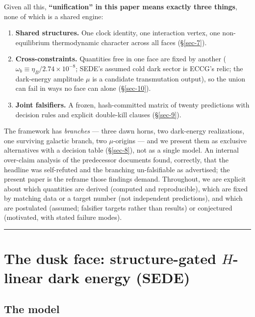 \documentclass[submission, Phys]{SciPost}
\providecommand{\tightlist}{\setlength{\itemsep}{0pt}\setlength{\parskip}{0pt}}
\begin{document}
Given all this, \textbf{``unification'' in this paper means exactly
three things}, none of which is a shared engine:

\begin{enumerate}
\def\labelenumi{\arabic{enumi}.}
\tightlist
\item
  \textbf{Shared structures.} One clock identity, one interaction
  vertex, one non-equilibrium thermodynamic character across all faces
  (§\ref{sec-7}).
\item
  \textbf{Cross-constraints.} Quantities free in one face are fixed by
  another (\(\omega_b \equiv \eta_B/2.74\times10^{-8}\); SEDE's assumed
  cold dark sector is ECCG's relic; the dark-energy amplitude \(\mu\) is
  a candidate transmutation output), so the union can fail in ways no
  face can alone (§\ref{sec-10}).
\item
  \textbf{Joint falsifiers.} A frozen, hash-committed matrix of twenty
  predictions with decision rules and explicit double-kill clauses
  (§\ref{sec-9}).
\end{enumerate}

The framework has \emph{branches} --- three dawn horns, two dark-energy
realizations, one surviving galactic branch, two \(\mu\)-origins --- and
we present them as exclusive alternatives with a decision table
(§\ref{sec-8}), not as a single model. An internal over-claim analysis
of the predecessor documents found, correctly, that the headline was
self-refuted and the branching un-falsifiable as advertised; the present
paper is the reframe those findings demand. Throughout, we are explicit
about which quantities are derived (computed and reproducible), which
are fixed by matching data or a target number (not independent
predictions), and which are postulated (assumed; falsifier targets
rather than results) or conjectured (motivated, with stated failure
modes).

\begin{center}\rule{0.5\linewidth}{0.5pt}\end{center}

\section{\texorpdfstring{The dusk face: structure-gated \(H\)-linear
dark energy
(SEDE)}{The dusk face: structure-gated -linear dark energy (SEDE)}}\label{sec-2}

\subsection{The model}\label{sec-2-1}
\end{document}
